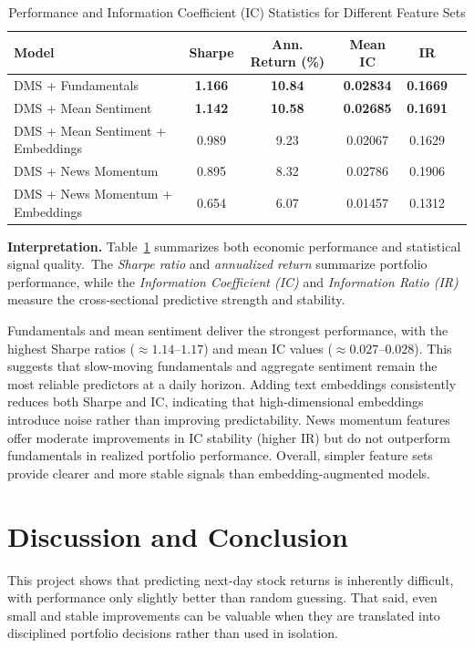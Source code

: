 \documentclass[11pt]{article}
\begin{document}
\begin{table}[H]
\centering
\begin{tabular}{lccccc}
\toprule
\textbf{Model} 
    & \textbf{Sharpe} 
    & \textbf{Ann. Return (\%)} 
    & \textbf{Mean IC} 
    & \textbf{IR} \\
\midrule
DMS + Fundamentals                 
    & \textbf{1.166} 
    & \textbf{10.84} 
    & \textbf{0.02834} 
    & \textbf{0.1669}  \\
DMS + Mean Sentiment               
    & \textbf{1.142} 
    & \textbf{10.58} 
    & \textbf{0.02685} 
    & \textbf{0.1691}  \\
DMS + Mean Sentiment + Embeddings  
    & 0.989 
    & 9.23 
    & 0.02067 
    & 0.1629  \\
DMS + News Momentum                
    & 0.895 
    & 8.32 
    & 0.02786 
    & 0.1906  \\
DMS + News Momentum + Embeddings   
    & 0.654 
    & 6.07 
    & 0.01457 
    & 0.1312  \\
\bottomrule
\end{tabular}
\caption{Performance and Information Coefficient (IC) Statistics for Different Feature Sets}
\label{tab:performance_ic}
\end{table}\noindent \textbf{Interpretation.}
Table~\ref{tab:performance_ic} summarizes both economic performance and statistical signal quality.~The \textit{Sharpe ratio} and \textit{annualized return} summarize portfolio performance, while the \textit{Information Coefficient (IC)} and \textit{Information Ratio (IR)} measure the cross-sectional predictive strength and stability. 

\vspace{6pt}
\noindent Fundamentals and mean sentiment deliver the strongest performance, with the highest Sharpe ratios ($\approx 1.14$–$1.17$) and mean IC values ($\approx 0.027$–$0.028$). This suggests that slow-moving fundamentals and aggregate sentiment remain the most reliable predictors at a daily horizon. Adding text embeddings consistently reduces both Sharpe and IC, indicating that high-dimensional embeddings introduce noise rather than improving predictability. News momentum features offer moderate improvements in IC stability (higher IR) but do not outperform fundamentals in realized portfolio performance. Overall, simpler feature sets provide clearer and more stable signals than embedding-augmented models.

\section{Discussion and Conclusion}
\noindent This project shows that predicting next-day stock returns is inherently difficult, with performance only slightly better than random guessing. That said, even small and stable improvements can be valuable when they are translated into disciplined portfolio decisions rather than used in isolation.\\
\end{document}
